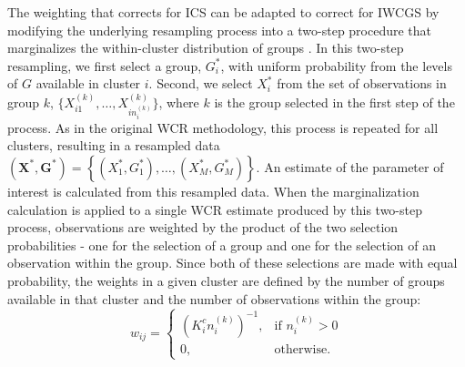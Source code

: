 The weighting that corrects for ICS can be adapted to correct for IWCGS by modifying the underlying resampling process into a two-step procedure that marginalizes the within-cluster distribution of groups \citep{dutta16, huang11}. In this two-step resampling, we first select a group, $G_{i}^{*}$, with uniform probability from the levels of $G$ available in cluster $i$. Second, we select $X_{i}^{*}$ from the set of observations in group $k$, $\{ X_{i1}^{(k)},\ldots,X_{in_{i}^{(k)}}^{(k)} \}$, where $k$ is the group selected in the first step of the process. As in the original WCR methodology, this process is repeated for all clusters, resulting in a resampled data $\left(\bm{X}^{*}, \bm{G}^{*}\right) = \left \{ (X_{1}^{*}, G_{1}^{*}), \ldots, (X_{M}^{*}, G_{M}^{*}) \right\}$. An estimate of the parameter of interest is calculated from this resampled data. When the marginalization calculation is applied to a single WCR estimate produced by this two-step process, observations are weighted by the product of the two selection probabilities - one for the selection of a group and one for the selection of an observation within the group. Since both of these selections are made with equal probability, the weights in a given cluster are defined by the number of groups available in that cluster and the number of observations within the group:
\begin{equation*}
	w_{ij}=
	\begin{cases}
		\left(K_{i}^{c}n_{i}^{(k)}\right)^{-1}, & \text{if } n_{i}^{(k)}>0 \\
		0, 																			 & \text{otherwise.}
	\end{cases}
\end{equation*}

